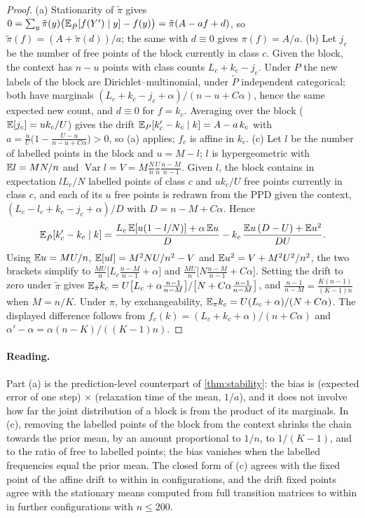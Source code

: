 \begin{proof}
(a) Stationarity of $\tilde\pi$ gives $0=\sum_y\tilde\pi(y)\big(\mathbb{E}_{\tilde P}[f(Y')\mid y]-f(y)\big)=\tilde\pi(A-af+d)$, so
$\tilde\pi(f)=(A+\tilde\pi(d))/a$; the same with $d\equiv0$ gives $\pi(f)=A/a$.
(b) Let $j_c$ be the number of free points of the block currently in class $c$. Given the block, the context has
$n-u$ points with class counts $L_c+k_c-j_c$. Under $P$ the new labels of the block are Dirichlet--multinomial, under
$\tilde P$ independent categorical; both have marginals $(L_c+k_c-j_c+\alpha)/(n-u+C\alpha)$, hence the same expected new
count, and $d\equiv0$ for $f=k_c$. Averaging over the block ($\mathbb{E}[j_c]=uk_c/U$) gives the drift
$\mathbb{E}_P[k_c'-k_c\mid k]=A-a\,k_c$ with $a=\frac uU\big(1-\frac{U-u}{n-u+C\alpha}\big)>0$, so (a) applies; $f_c$ is affine in $k_c$.
(c) Let $l$ be the number of labelled points in the block and $u=M-l$; $l$ is hypergeometric with $\mathbb{E} l=MN/n$ and
$\operatorname{Var}l=V=M\frac Nn\frac Un\frac{n-M}{n-1}$. Given $l$, the block contains in expectation $lL_c/N$ labelled
points of class $c$ and $uk_c/U$ free points currently in class $c$, and each of its $u$ free points is redrawn from the
PPD given the context, $(L_c-l_c+k_c-j_c+\alpha)/D$ with $D=n-M+C\alpha$. Hence
\[
  \mathbb{E}_{\tilde P}[k_c'-k_c\mid k]=\frac{L_c\,\mathbb{E}[u(1-l/N)]+\alpha\,\mathbb{E} u}{D}-k_c\,\frac{\mathbb{E} u\,(D-U)+\mathbb{E} u^2}{DU}.
\]
Using $\mathbb{E} u=MU/n$, $\mathbb{E}[ul]=M^2NU/n^2-V$ and $\mathbb{E} u^2=V+M^2U^2/n^2$, the two brackets simplify to
$\frac{MU}{n}\big[L_c\frac{n-M}{n-1}+\alpha\big]$ and $\frac{MU}{n}\big[N\frac{n-M}{n-1}+C\alpha\big]$. Setting the drift to
zero under $\tilde\pi$ gives $\mathbb{E}_{\tilde\pi}k_c=U\big[L_c+\alpha\frac{n-1}{n-M}\big]/\big[N+C\alpha\frac{n-1}{n-M}\big]$, and
$\frac{n-1}{n-M}=\frac{K(n-1)}{(K-1)n}$ when $M=n/K$. Under $\pi$, by exchangeability, $\mathbb{E}_\pi k_c=U(L_c+\alpha)/(N+C\alpha)$. The
displayed difference follows from $f_c(k)=(L_c+k_c+\alpha)/(n+C\alpha)$ and $\alpha'-\alpha=\alpha(n-K)/((K-1)n)$.
\end{proof}

\paragraph{Reading.} Part (a) is the prediction-level counterpart of \cref{thm:stability}: the bias is (expected error
of one step) $\times$ (relaxation time of the mean, $1/a$), and it does not involve how far the joint distribution of a
block is from the product of its marginals. In (c), removing the labelled points of the block from the context shrinks
the chain towards the prior mean, by an amount proportional to $1/n$, to $1/(K-1)$, and to the ratio of free to labelled
points; the bias vanishes when the labelled frequencies equal the prior mean. The closed form of (c) agrees with the fixed point of the
affine drift to within  in  configurations, and the drift fixed points agree with the
stationary means computed from full transition matrices to within  in  further
configurations with $n\le200$.


